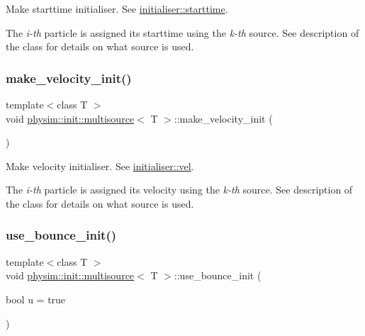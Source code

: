 Make starttime initialiser. See \hyperlink{classphysim_1_1init_1_1initialiser_a651ed09452c1621cec2ca7f52073f53f}{initialiser\+::starttime}. 

The {\itshape i-\/th} particle is assigned its starttime using the {\itshape k-\/th} source. See description of the class for details on what source is used. \mbox{\label{classphysim_1_1init_1_1multisource_a9bd421ceff83a6989e071cb0eebcae77}} 
\subsubsection{\texorpdfstring{make\+\_\+velocity\+\_\+init()}{make\_velocity\_init()}}
{\footnotesize\ttfamily template$<$class T $>$ \\
void \hyperlink{classphysim_1_1init_1_1multisource}{physim\+::init\+::multisource}$<$ T $>$\+::make\+\_\+velocity\+\_\+init (\begin{DoxyParamCaption}{ }\end{DoxyParamCaption})}



Make velocity initialiser. See \hyperlink{classphysim_1_1init_1_1initialiser_a0e6b1de60df484977b975369b225e89b}{initialiser\+::vel}. 

The {\itshape i-\/th} particle is assigned its velocity using the {\itshape k-\/th} source. See description of the class for details on what source is used. \mbox{\label{classphysim_1_1init_1_1multisource_a11d489afb2900b0ecec211e79dad14ef}} 
\subsubsection{\texorpdfstring{use\+\_\+bounce\+\_\+init()}{use\_bounce\_init()}}
{\footnotesize\ttfamily template$<$class T $>$ \\
void \hyperlink{classphysim_1_1init_1_1multisource}{physim\+::init\+::multisource}$<$ T $>$\+::use\+\_\+bounce\+\_\+init (\begin{DoxyParamCaption}\item[{bool}]{u = {\ttfamily true} }\end{DoxyParamCaption})}



